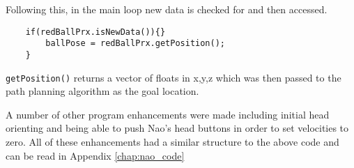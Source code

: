 Following this, in the main loop new data is checked for and then accessed.
\begin{lstlisting}
	if(redBallPrx.isNewData()){}
		ballPose = redBallPrx.getPosition();
	}
\end{lstlisting}
\lstinline$getPosition()$ returns a vector of floats in x,y,z which was then passed to the path planning algorithm as the goal location.

A number of other program enhancements were made including initial head orienting and being able to push Nao's head buttons in order to set velocities to zero. All of these enhancements had a similar structure to the above code and can be read in Appendix \ref{chap:nao_code}



